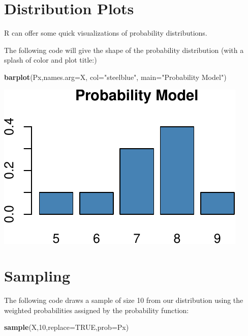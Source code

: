 \documentclass[
]{book}
\newenvironment{Shaded}{\begin{snugshade}}{\end{snugshade}}
\newcommand{\AttributeTok}[1]{\textcolor[rgb]{0.13,0.29,0.53}{#1}}
\newcommand{\ConstantTok}[1]{\textcolor[rgb]{0.56,0.35,0.01}{#1}}
\newcommand{\DecValTok}[1]{\textcolor[rgb]{0.00,0.00,0.81}{#1}}
\newcommand{\FunctionTok}[1]{\textcolor[rgb]{0.13,0.29,0.53}{\textbf{#1}}}
\newcommand{\NormalTok}[1]{#1}
\newcommand{\StringTok}[1]{\textcolor[rgb]{0.31,0.60,0.02}{#1}}
\theoremstyle{definition}
\theoremstyle{definition}
\theoremstyle{definition}
\theoremstyle{definition}
\theoremstyle{remark}
\begin{document}
\section{Distribution Plots}\label{distribution-plots}

R can offer some quick visualizations of probability distributions.

The following code will give the shape of the probability distribution (with a splash of color and plot title:)

\begin{Shaded}
\begin{Highlighting}[]
\FunctionTok{barplot}\NormalTok{(Px,}\AttributeTok{names.arg=}\NormalTok{X, }\AttributeTok{col=}\StringTok{"steelblue"}\NormalTok{, }\AttributeTok{main=}\StringTok{"Probability Model"}\NormalTok{)}
\end{Highlighting}
\end{Shaded}

\includegraphics{math340-notes_files/figure-latex/unnamed-chunk-134-1.pdf}

\section{Sampling}\label{sampling}

The following code draws a sample of size 10 from our distribution using the weighted probabilities assigned by the probability function:

\begin{Shaded}
\begin{Highlighting}[]
\FunctionTok{sample}\NormalTok{(X,}\DecValTok{10}\NormalTok{,}\AttributeTok{replace=}\ConstantTok{TRUE}\NormalTok{,}\AttributeTok{prob=}\NormalTok{Px)}
\end{Highlighting}
\end{Shaded}
\end{document}

